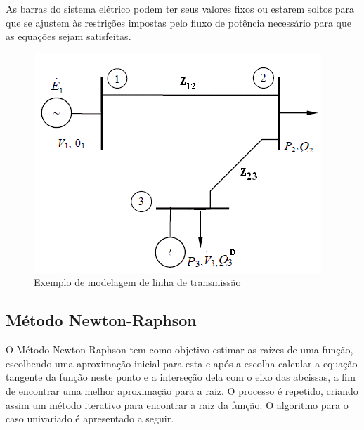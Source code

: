 As barras do sistema elétrico podem ter seus valores fixos ou estarem
soltos para que se ajustem às restrições impostas pelo fluxo de potência
necessário para que as equações sejam satisfeitas. 

\begin{figure}
\begin{centering}
\includegraphics{anexos/aula3_barras}
\par\end{centering}



\protect\caption{\label{fig:modelagem-sistema-1}Exemplo de modelagem de linha de transmissão}
\end{figure}




\subsection{Método Newton-Raphson}
O Método Newton-Raphson tem como objetivo estimar as raízes de uma
função, escolhendo uma aproximação inicial para esta e após a escolha
calcular a equação tangente da função neste ponto e a interseção dela
com o eixo das abcissas, a fim de encontrar uma melhor aproximação
para a raiz. O processo é repetido, criando assim um método iterativo
para encontrar a raiz da função. O algoritmo para o caso univariado é apresentado a seguir.


